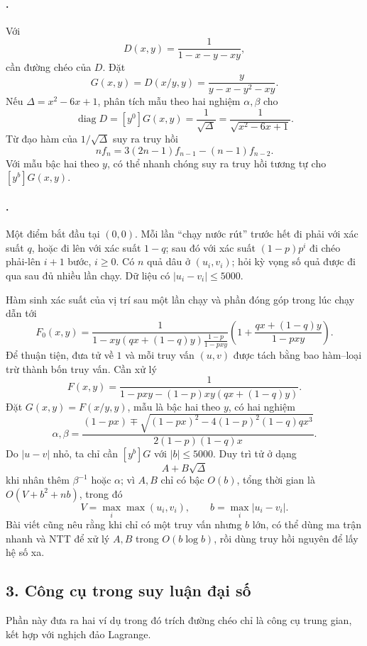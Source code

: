 \documentclass[11pt]{article}
\begin{document}
\paragraph{.}
Với
\[
  D(x,y)=\frac{1}{1-x-y-xy},
\]
cần đường chéo của \(D\). Đặt
\[
  G(x,y)=D(x/y,y)=\frac{y}{y-x-y^2-xy}.
\]
Nếu \(\Delta=x^2-6x+1\), phân tích mẫu theo hai nghiệm \(\alpha,\beta\) cho
\[
  \operatorname{diag}D=[y^0]G(x,y)=\frac{1}{\sqrt{\Delta}}
  =\frac{1}{\sqrt{x^2-6x+1}}.
\]
Từ đạo hàm của \(1/\sqrt{\Delta}\) suy ra truy hồi
\[
  n f_n=3(2n-1)f_{n-1}-(n-1)f_{n-2}.
\]
Với mẫu bậc hai theo \(y\), có thể nhanh chóng suy ra truy hồi tương tự cho
\([y^b]G(x,y)\).

\paragraph{.}
Một điểm bắt đầu tại \((0,0)\). Mỗi lần ``chạy nước rút'' trước hết đi phải
với xác suất \(q\), hoặc đi lên với xác suất \(1-q\); sau đó với xác suất
\((1-p)p^i\) đi chéo phải-lên \(i+1\) bước, \(i\ge0\). Có \(n\) quả dâu ở
\((u_i,v_i)\); hỏi kỳ vọng số quả được đi qua sau đủ nhiều lần chạy. Dữ liệu
có \(|u_i-v_i|\le 5000\).

Hàm sinh xác suất của vị trí sau một lần chạy và phần đóng góp trong lúc chạy
dẫn tới
\[
  F_0(x,y)=
  \frac{1}{1-xy(qx+(1-q)y)\frac{1-p}{1-pxy}}
  \left(1+\frac{qx+(1-q)y}{1-pxy}\right).
\]
Để thuận tiện, đưa tử về \(1\) và mỗi truy vấn \((u,v)\) được tách bằng bao
hàm--loại trừ thành bốn truy vấn. Cần xử lý
\[
  F(x,y)=\frac{1}{1-pxy-(1-p)xy(qx+(1-q)y)}.
\]
Đặt \(G(x,y)=F(x/y,y)\), mẫu là bậc hai theo \(y\), có hai nghiệm
\[
  \alpha,\beta=
  \frac{(1-px)\mp\sqrt{(1-px)^2-4(1-p)^2(1-q)qx^3}}
       {2(1-p)(1-q)x}.
\]
Do \(|u-v|\) nhỏ, ta chỉ cần \([y^b]G\) với \(|b|\le 5000\). Duy trì tử ở dạng
\[
  A+B\sqrt{\Delta}
\]
khi nhân thêm \(\beta^{-1}\) hoặc \(\alpha\); vì \(A,B\) chỉ có bậc
\(O(b)\), tổng thời gian là \(O(V+b^2+nb)\), trong đó
\[
  V=\max_i\max(u_i,v_i),\qquad b=\max_i |u_i-v_i|.
\]
Bài viết cũng nêu rằng khi chỉ có một truy vấn nhưng \(b\) lớn, có thể dùng
ma trận nhanh và NTT để xử lý \(A,B\) trong \(O(b\log b)\), rồi dùng truy hồi
nguyên để lấy hệ số xa.

\subsection*{3. Công cụ trong suy luận đại số}

Phần này đưa ra hai ví dụ trong đó trích đường chéo chỉ là công cụ trung gian,
kết hợp với nghịch đảo Lagrange.
\end{document}
